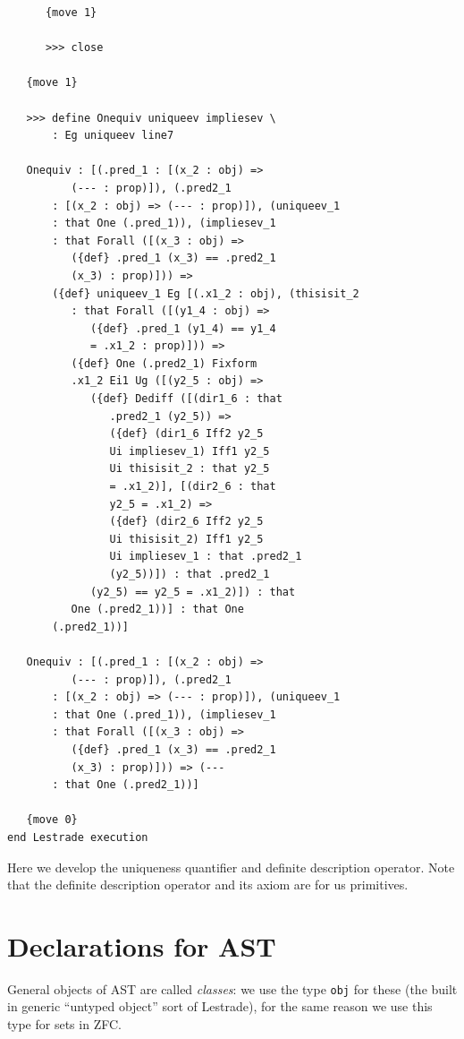 \documentclass[12pt]{article}
\begin{document}
\begin{verbatim}
      {move 1}

      >>> close

   {move 1}

   >>> define Onequiv uniqueev impliesev \
       : Eg uniqueev line7

   Onequiv : [(.pred_1 : [(x_2 : obj) => 
          (--- : prop)]), (.pred2_1 
       : [(x_2 : obj) => (--- : prop)]), (uniqueev_1 
       : that One (.pred_1)), (impliesev_1 
       : that Forall ([(x_3 : obj) => 
          ({def} .pred_1 (x_3) == .pred2_1 
          (x_3) : prop)])) => 
       ({def} uniqueev_1 Eg [(.x1_2 : obj), (thisisit_2 
          : that Forall ([(y1_4 : obj) => 
             ({def} .pred_1 (y1_4) == y1_4 
             = .x1_2 : prop)])) => 
          ({def} One (.pred2_1) Fixform 
          .x1_2 Ei1 Ug ([(y2_5 : obj) => 
             ({def} Dediff ([(dir1_6 : that 
                .pred2_1 (y2_5)) => 
                ({def} (dir1_6 Iff2 y2_5 
                Ui impliesev_1) Iff1 y2_5 
                Ui thisisit_2 : that y2_5 
                = .x1_2)], [(dir2_6 : that 
                y2_5 = .x1_2) => 
                ({def} (dir2_6 Iff2 y2_5 
                Ui thisisit_2) Iff1 y2_5 
                Ui impliesev_1 : that .pred2_1 
                (y2_5))]) : that .pred2_1 
             (y2_5) == y2_5 = .x1_2)]) : that 
          One (.pred2_1))] : that One 
       (.pred2_1))]

   Onequiv : [(.pred_1 : [(x_2 : obj) => 
          (--- : prop)]), (.pred2_1 
       : [(x_2 : obj) => (--- : prop)]), (uniqueev_1 
       : that One (.pred_1)), (impliesev_1 
       : that Forall ([(x_3 : obj) => 
          ({def} .pred_1 (x_3) == .pred2_1 
          (x_3) : prop)])) => (--- 
       : that One (.pred2_1))]

   {move 0}
end Lestrade execution
\end{verbatim}

Here we develop the uniqueness quantifier and definite description operator.  Note that the definite description operator and its axiom are for us primitives.

\section{Declarations for AST}

General objects of AST are called {\em classes\/}:  we use the type {\tt obj} for these (the built in generic ``untyped object'' sort of Lestrade), for the same reason we use this type for sets in ZFC.
\end{document}
